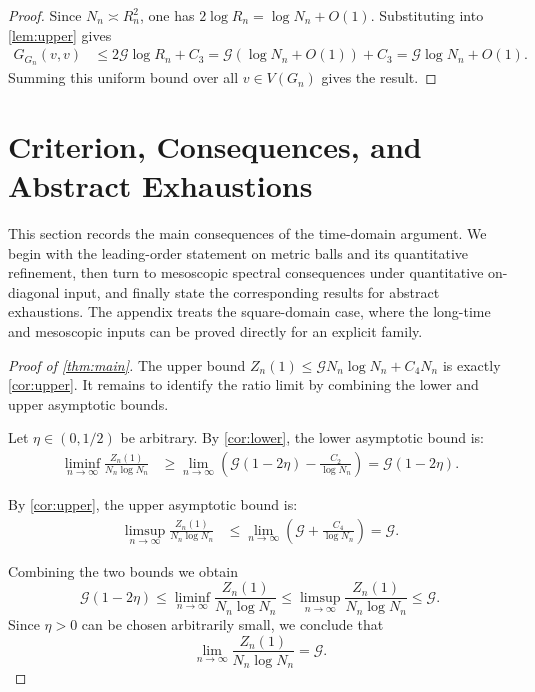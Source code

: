 \documentclass[reqno]{amsart}
\numberwithin{equation}{section}
\theoremstyle{definition}
\theoremstyle{remark}
\newcommand{\Cref}[1]{\autoref{#1}}
\newcommand{\cG}{\mathcal{G}}
\begin{document}
\begin{proof}
Since $N_n \asymp R_n^2$, one has $2\log R_n = \log N_n + O(1)$. Substituting into \Cref{lem:upper} gives
\begin{align*}
G_{G_n}(v,v) &\leq 2\cG \log R_n + C_3 = \cG (\log N_n + O(1)) + C_3 = \cG \log N_n + O(1).
\end{align*}
Summing this uniform bound over all $v \in V(G_n)$ gives the result.
\end{proof}

\section{Criterion, Consequences, and Abstract Exhaustions}\label{sec:discussion}

This section records the main consequences of the time-domain argument. We begin with the leading-order statement on metric balls and its quantitative refinement, then turn to mesoscopic spectral consequences under quantitative on-diagonal input, and finally state the corresponding results for abstract exhaustions. The appendix treats the square-domain case, where the long-time and mesoscopic inputs can be proved directly for an explicit family.

\begin{proof}[Proof of \Cref{thm:main}]
The upper bound $Z_n(1)\le \cG N_n\log N_n + C_4 N_n$ is exactly \Cref{cor:upper}. It remains to identify the ratio limit by combining the lower and upper asymptotic bounds.


Let $\eta \in (0,1/2)$ be arbitrary. By \Cref{cor:lower}, the lower asymptotic bound is:
\begin{align*}
\liminf_{n \to \infty} \frac{Z_n(1)}{N_n \log N_n} &\geq \lim_{n \to \infty} \left( \cG(1-2\eta) - \frac{C_2}{\log N_n} \right) = \cG(1-2\eta).
\end{align*}

By \Cref{cor:upper}, the upper asymptotic bound is:
\begin{align*}
\limsup_{n \to \infty} \frac{Z_n(1)}{N_n \log N_n} &\leq \lim_{n \to \infty} \left( \cG + \frac{C_4}{\log N_n} \right) = \cG.
\end{align*}

Combining the two bounds we obtain
\[
\cG(1-2\eta) \leq \liminf_{n \to \infty} \frac{Z_n(1)}{N_n \log N_n} \leq \limsup_{n \to \infty} \frac{Z_n(1)}{N_n \log N_n} \leq \cG.
\]
Since $\eta > 0$ can be chosen arbitrarily small, we conclude that
\[
\lim_{n \to \infty} \frac{Z_n(1)}{N_n \log N_n} = \cG.
\]
\end{proof}
\end{document}
